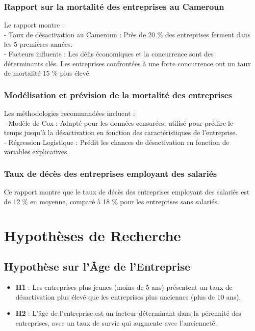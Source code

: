\documentclass[a4paper,12pt]{report}
\begin{document}
\subsubsection{Rapport sur la mortalité des entreprises au Cameroun}
Le rapport montre : \\ 
- Taux de désactivation au Cameroun : Près de 20 \% des entreprises ferment dans les 5 premières années. \\
 - Facteurs influents : Les défis économiques et la concurrence sont des déterminants clés. Les entreprises confrontées à une forte concurrence ont un taux de mortalité 15 \% plus élevé.
\subsubsection{Modélisation et prévision de la mortalité des entreprises}
Les méthodologies recommandées incluent : \\
- Modèle de Cox : Adapté pour les données censurées, utilisé pour prédire le temps jusqu’à la désactivation en fonction des caractéristiques de l’entreprise. \\
- Régression Logistique : Prédit les chances de désactivation en fonction de variables explicatives. \\
\subsubsection{Taux de décès des entreprises employant des salariés}
Ce rapport montre que le taux de décès des entreprises employant des salariés est de 12 \% en moyenne, comparé à 18 \% pour les entreprises sans salariés.

\section{Hypothèses de Recherche}

\subsection{Hypothèse sur l'Âge de l’Entreprise}
\begin{itemize}
    \item \textbf{H1} : Les entreprises plus jeunes (moins de 5 ans) présentent un taux de désactivation plus élevé que les entreprises plus anciennes (plus de 10 ans).
    \item \textbf{H2} : L'âge de l'entreprise est un facteur déterminant dans la pérennité des entreprises, avec un taux de survie qui augmente avec l'ancienneté.
\end{itemize}
\end{document}

